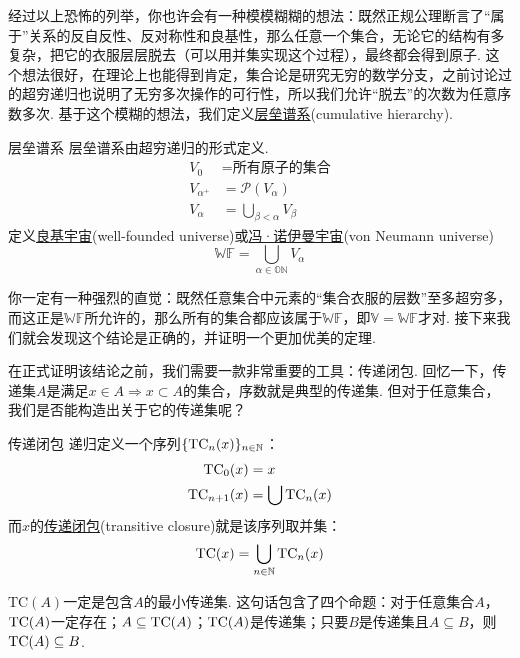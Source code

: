 经过以上恐怖的列举，你也许会有一种模模糊糊的想法：既然正规公理断言了“属于”关系的反自反性、反对称性和良基性，那么任意一个集合，无论它的结构有多复杂，把它的衣服层层脱去（可以用并集实现这个过程），最终都会得到原子. 这个想法很好，在理论上也能得到肯定，集合论是研究无穷的数学分支，之前讨论过的超穷递归也说明了无穷多次操作的可行性，所以我们允许“脱去”的次数为任意序数多次. 基于这个模糊的想法，我们定义\underline{层垒谱系}(cumulative hierarchy).

\begin{definition}{层垒谱系}
    层垒谱系由超穷递归的形式定义.
    \[
        \begin{aligned}
            V_0 &= \mbox{所有原子的集合} \\
            V_{\alpha^+} &= \mathcal{P}(V_\alpha) \\
            V_{\alpha} &= \bigcup_{\beta < \alpha}V_\beta
        \end{aligned}
    \]
    定义\underline{良基宇宙}(well-founded universe)或\underline{冯·诺伊曼宇宙}(von Neumann universe)
    \[\mathbb{WF} = \bigcup_{\alpha \in \mathbb{ON}}V_{\alpha}\]
\end{definition}

你一定有一种强烈的直觉：既然任意集合中元素的“集合衣服的层数”至多超穷多，而这正是\(\mathbb{WF}\)所允许的，那么所有的集合都应该属于\(\mathbb{WF}\)，即\(\mathbb{V}=\mathbb{WF}\)才对. 接下来我们就会发现这个结论是正确的，并证明一个更加优美的定理.

在正式证明该结论之前，我们需要一款非常重要的工具：传递闭包. 回忆一下，传递集\(A\)是满足\(x \in A \Rightarrow x \subset A\)的集合，序数就是典型的传递集. 但对于任意集合，我们是否能构造出关于它的传递集呢？
\begin{definition}{传递闭包}
    递归定义一个序列\(\{{\rm TC}_n(x)\}_{n \in \mathbb{N}}\)：
    \[
        \begin{aligned}
            {\rm TC}_0(x) &= x \\
            {\rm TC}_{n+1}(x) &= \bigcup {\rm TC}_n(x)
        \end{aligned}
    \]
    而\(x\)的\underline{传递闭包}(transitive closure)就是该序列取并集：
    \[{\rm TC}(x) = \bigcup_{n \in \mathbb{N}}{\rm TC}_n(x)\]
\end{definition}

\(\mathrm{TC}(A)\)一定是包含\(A\)的最小传递集. 这句话包含了四个命题：对于任意集合\(A\)，\({\rm TC}(A)\)一定存在；\(A \subseteq {\rm TC}(A)\)；\({\rm TC}(A)\)是传递集；只要\(B\)是传递集且\(A \subseteq B\)，则\({\rm TC}(A) \subseteq B\).

